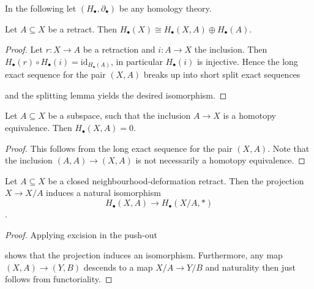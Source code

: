 
In the following let $(H_\bullet,\partial_\bullet)$ be any homology theory.

\begin{lemma}
    Let $A \subseteq X$ be a retract. Then $H_\bullet(X) \cong H_\bullet(X,A) \oplus H_\bullet(A)$.
\end{lemma}

\begin{proof}
    Let $r \colon X \to A$ be a retraction and $i \colon A \to X$ the inclusion. Then $H_\bullet(r) \circ H_\bullet(i) = \mathrm{id}_{H_\bullet(A)}$, in particular $H_\bullet(i)$ is injective. Hence the long exact sequence for the pair $(X,A)$ breaks up into short split exact sequences
    \begin{center}
    \end{center}
    and the splitting lemma yields the desired isomorphism.
\end{proof}

\begin{lemma}
    Let $A \subseteq X$ be a subspace, such that the inclusion $A \to X$ is a homotopy equivalence. Then $H_\bullet(X,A) = 0$.
\end{lemma}
\begin{proof}
    This follows from the long exact sequence for the pair $(X,A)$. Note that the inclusion $(A,A) \to (X,A)$ is not necessarily a homotopy equivalence.
\end{proof}

\begin{lemma}
    Let $A \subseteq X$ be a closed neighbourhood-deformation retract. Then the projection $X \to X/A$ induces a natural isomorphism $$H_\bullet(X,A) \to H_\bullet(X/A,\ast)$$.
\end{lemma}
\begin{proof}
    Applying excision in the push-out
    \begin{center}
    \end{center}
    shows that the projection induces an isomorphism. Furthermore, any map $(X,A) \to (Y,B)$ descends to a map $X/A \to Y/B$ and naturality then just follows from functoriality. 

\end{proof}